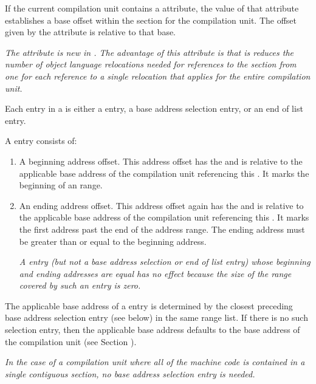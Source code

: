 If the current compilation unit contains a \DWATrangesbase{}
attribute, the value of that attribute establishes a base
offset within the \dotdebugranges{} section for the compilation
unit. The offset given by the \DWATranges{} attribute is
relative to that base.

\textit{The \DWATrangesbase{} attribute is new in .
The advantage of this attribute is that is reduces the number of
object language relocations needed for references to the \dotdebugranges{}
section from one for each reference to a single relocation that
applies for the entire compilation unit.}

Each entry in a  is either a 
 entry,
a base address selection entry, or an 
end of list entry.

A  entry consists of:
\begin{enumerate}[1. ]
\item A beginning address offset. This address offset has the 
 and is relative to
the applicable base address of the compilation unit referencing this 
. 
It marks the
beginning of an 
range.

\item An ending address offset. This address offset again has the 
 and is relative
to the applicable base address of the compilation unit referencing 
this .
It marks the
first address past the end of the address range.
The ending address must be greater than or
equal to the beginning address.

\textit{A  entry (but not a base address selection or end of list entry) whose beginning and
ending addresses are equal has no effect because the size of the range covered by such an
entry is zero.}
\end{enumerate}

The applicable base address of a  entry
is determined
by the closest preceding base address selection entry (see
below) in the same range list. If there is no such selection
entry, then the applicable base address defaults to the base
address of the compilation unit 
(see Section ).

\textit{In the case of a compilation unit where all of the machine
code is contained in a single contiguous section, no base
address selection entry is needed.}

